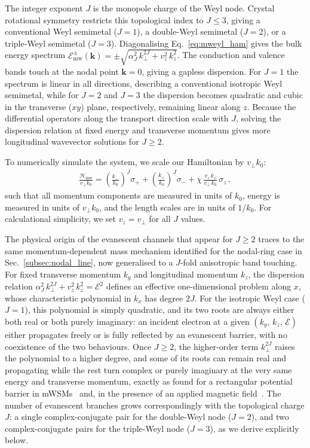 \documentclass[aps,prb,onecolumn,longbibliography,nofootinbib,citeautoscript,10pt]{revtex4-2}
\begin{document}
The integer exponent $J$ is the monopole charge of the Weyl node. Crystal rotational symmetry restricts this topological index to $J \le 3$, giving a conventional Weyl semimetal ($J=1$), a double-Weyl semimetal ($J=2$), or a triple-Weyl semimetal ($J=3$). Diagonalising Eq.~\eqref{eq:mweyl_ham} gives the bulk energy spectrum $\mathcal{E}_{\text{mw}}^{\pm}(\boldsymbol{k}) = \pm\sqrt{\alpha_J^2 \, k_\perp^{2J} + v_z^2 \, k_z^2}$. The conduction and valence bands touch at the nodal point $\boldsymbol{k} = 0$, giving a gapless dispersion. For $J=1$ the spectrum is linear in all directions, describing a conventional isotropic Weyl semimetal, while for $J=2$ and $J=3$ the dispersion becomes quadratic and cubic in the transverse ($xy$) plane, respectively, remaining linear along $z$. Because the differential operators along the transport direction scale with $J$, solving the dispersion relation at fixed energy and transverse momentum gives more longitudinal wavevector solutions for $J \ge 2$.

To numerically simulate the system, we scale our Hamiltonian by $v_\perp k_0$:
\begin{align}
\frac{\mathcal{H}_{\text{mw}}} {v_\perp k_0} = \left(\frac{k_{-}} {k_0}\right)^J \sigma_+ 
+ \left(\frac{k_{+}} {k_0}\right)^J \sigma_- + \chi \, \frac{v_z\, k_z} {v_\perp \, k_0} \,\sigma_z \,,
\end{align}
such that all momentum components are measured in units of $k_0$, energy is measured in units of $v_\perp k_0$, and the length scales are in units of $1/k_0$. For calculational simplicity, we set $v_z = v_\perp$ for all $J$ values.

The physical origin of the evanescent channels that appear for $J\ge 2$ traces to the same momentum-dependent mass mechanism identified for the nodal-ring case in Sec.~\ref{subsec:nodal_line}, now generalised to a $J$-fold anisotropic band touching. For fixed transverse momentum $k_y$ and longitudinal momentum $k_z$, the dispersion relation $\alpha_J^2\,k_\perp^{2J} + v_z^2 \, k_z^2 = \mathcal{E}^2$ defines an effective one-dimensional problem along $x$, whose characteristic polynomial in $k_x$ has degree $2J$. For the isotropic Weyl case ($J=1$), this polynomial is simply quadratic, and its two roots are always either both real or both purely imaginary: an incident electron at a given $(k_y, \,k_z, \,\mathcal{E})$ either propagates freely or is fully reflected by an evanescent barrier, with no coexistence of the two behaviours. Once $J\ge 2$, the higher-order term $k_\perp^{2J}$ raises the polynomial to a higher degree, and some of its roots can remain real and propagating while the rest turn complex or purely imaginary at the very same energy and transverse momentum, exactly as found for a rectangular potential barrier in mWSMs~\cite{Deng2020} and, in the presence of an applied magnetic field~\cite{ips-aritra}. The number of evanescent branches grows correspondingly with the topological charge $J$: a single complex-conjugate pair for the double-Weyl node ($J=2$), and two complex-conjugate pairs for the triple-Weyl node ($J=3$), as we derive explicitly below.
\end{document}
